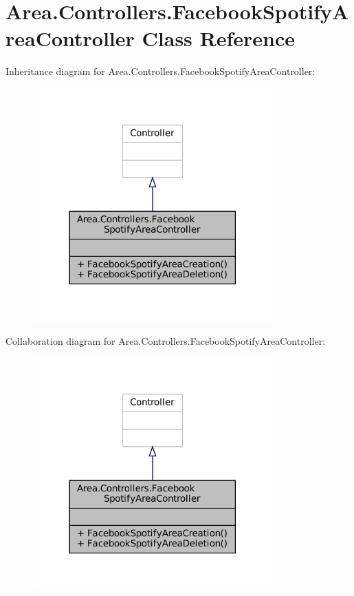 \hypertarget{classArea_1_1Controllers_1_1FacebookSpotifyAreaController}{}\section{Area.\+Controllers.\+Facebook\+Spotify\+Area\+Controller Class Reference}
\label{classArea_1_1Controllers_1_1FacebookSpotifyAreaController}


Inheritance diagram for Area.\+Controllers.\+Facebook\+Spotify\+Area\+Controller\+:
\nopagebreak
\begin{figure}[H]
\begin{center}
\leavevmode
\includegraphics[width=261pt]{classArea_1_1Controllers_1_1FacebookSpotifyAreaController__inherit__graph}
\end{center}
\end{figure}


Collaboration diagram for Area.\+Controllers.\+Facebook\+Spotify\+Area\+Controller\+:
\nopagebreak
\begin{figure}[H]
\begin{center}
\leavevmode
\includegraphics[width=261pt]{classArea_1_1Controllers_1_1FacebookSpotifyAreaController__coll__graph}
\end{center}
\end{figure}
